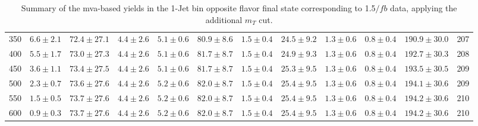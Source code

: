 \begin{table}
{\begin{center}
\begin{tabular}{l c c c c c c c c c c c }
350 & $6.6\pm2.1$ & $72.4\pm27.1$ & $4.4\pm2.6$ & $5.1\pm0.6$ & $80.9\pm8.6$ & $1.5\pm0.4$ & $24.5\pm9.2$ & $1.3\pm0.6$ & $0.8\pm0.4$ & $190.9\pm30.0$ & 207 \\
400 & $5.5\pm1.7$ & $73.0\pm27.3$ & $4.4\pm2.6$ & $5.1\pm0.6$ & $81.7\pm8.7$ & $1.5\pm0.4$ & $24.9\pm9.3$ & $1.3\pm0.6$ & $0.8\pm0.4$ & $192.7\pm30.3$ & 208 \\
450 & $3.6\pm1.1$ & $73.4\pm27.5$ & $4.4\pm2.6$ & $5.1\pm0.6$ & $81.7\pm8.7$ & $1.5\pm0.4$ & $25.3\pm9.5$ & $1.3\pm0.6$ & $0.8\pm0.4$ & $193.5\pm30.5$ & 209 \\
500 & $2.3\pm0.7$ & $73.6\pm27.6$ & $4.4\pm2.6$ & $5.2\pm0.6$ & $82.0\pm8.7$ & $1.5\pm0.4$ & $25.4\pm9.5$ & $1.3\pm0.6$ & $0.8\pm0.4$ & $194.1\pm30.6$ & 209 \\
550 & $1.5\pm0.5$ & $73.7\pm27.6$ & $4.4\pm2.6$ & $5.2\pm0.6$ & $82.0\pm8.7$ & $1.5\pm0.4$ & $25.4\pm9.5$ & $1.3\pm0.6$ & $0.8\pm0.4$ & $194.2\pm30.6$ & 210 \\
600 & $0.9\pm0.3$ & $73.7\pm27.6$ & $4.4\pm2.6$ & $5.2\pm0.6$ & $82.0\pm8.7$ & $1.5\pm0.4$ & $25.4\pm9.5$ & $1.3\pm0.6$ & $0.8\pm0.4$ & $194.2\pm30.6$ & 210 \\
\hline
\end{tabular}
\end{center}
}
\caption{Summary of the mva-based yields in the 1-Jet bin opposite flavor final state corresponding to 1.5$/fb$ data, applying the additional $m_T$ cut.}
\end{table}
